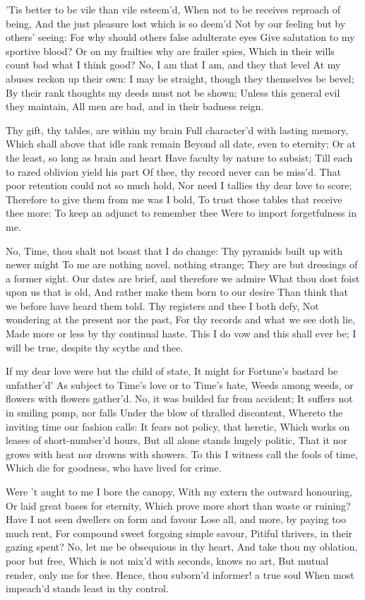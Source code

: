 \documentclass[twocolumn]{book}
\begin{document}
'Tis better to be vile than vile esteem'd,
When not to be receives reproach of being,
And the just pleasure lost which is so deem'd
Not by our feeling but by others' seeing:
For why should others false adulterate eyes
Give salutation to my sportive blood?
Or on my frailties why are frailer spies,
Which in their wills count bad what I think good?
No, I am that I am, and they that level
At my abuses reckon up their own:
I may be straight, though they themselves be bevel;
By their rank thoughts my deeds must not be shown;
  Unless this general evil they maintain,
  All men are bad, and in their badness reign.


Thy gift, thy tables, are within my brain
Full character'd with lasting memory,
Which shall above that idle rank remain
Beyond all date, even to eternity;
Or at the least, so long as brain and heart
Have faculty by nature to subsist;
Till each to razed oblivion yield his part
Of thee, thy record never can be miss'd.
That poor retention could not so much hold,
Nor need I tallies thy dear love to score;
Therefore to give them from me was I bold,
To trust those tables that receive thee more:
  To keep an adjunct to remember thee
  Were to import forgetfulness in me.


No, Time, thou shalt not boast that I do change:
Thy pyramids built up with newer might
To me are nothing novel, nothing strange;
They are but dressings of a former sight.
Our dates are brief, and therefore we admire
What thou dost foist upon us that is old,
And rather make them born to our desire
Than think that we before have heard them told.
Thy registers and thee I both defy,
\numerus*{}Not wondering at the present nor the past,
For thy records and what we see doth lie,
Made more or less by thy continual haste.
  This I do vow and this shall ever be;
  I will be true, despite thy scythe and thee.


If my dear love were but the child of state,
It might for Fortune's bastard be unfather'd'
As subject to Time's love or to Time's hate,
Weeds among weeds, or flowers with flowers gather'd.
No, it was builded far from accident;
It suffers not in smiling pomp, nor falls
Under the blow of thralled discontent,
Whereto the inviting time our fashion calls:
It fears not policy, that heretic,
Which works on leases of short-number'd hours,
But all alone stands hugely politic,
That it nor grows with heat nor drowns with showers.
  To this I witness call the fools of time,
  Which die for goodness, who have lived for crime.


Were 't aught to me I bore the canopy,
With my extern the outward honouring,
Or laid great bases for eternity,
Which prove more short than waste or ruining?
\numerus*{}Have I not seen dwellers on form and favour
Lose all, and more, by paying too much rent,
For compound sweet forgoing simple savour,
Pitiful thrivers, in their gazing spent?
No, let me be obsequious in thy heart,
And take thou my oblation, poor but free,
Which is not mix'd with seconds, knows no art,
But mutual render, only me for thee.
  Hence, thou suborn'd informer! a true soul
  When most impeach'd stands least in thy control.
\end{document}
